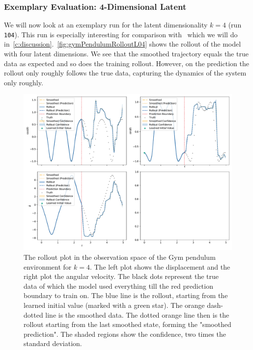 		\subsubsection{Exemplary Evaluation: 4-Dimensional Latent}
			\label{subsubsec:gymPendulumL04}

			We will now look at an exemplary run for the latent dimensionality \( k = 4 \) (run \texttt{104}). This run is especially interesting for comparison with~\cite{mortonDeepVariationalKoopman2019a} which we will do in~\autoref{c:discussion}.~\autoref{fig:gymPendulumRolloutL04} shows the rollout of the model with four latent dimensions. We see that the smoothed trajectory equals the true data as expected and so does the training rollout. However, on the prediction the rollout only roughly follows the true data, capturing the dynamics of the system only roughly.

			\begin{figure}
				\centering
				\includegraphics[width=\linewidth]{figures/results/pendulum-gym/run-latent-dim-04/rollout-observations-N0.pdf}
				\caption[Rollout of the Gym pendulum experiment for 4 latent dimensions]{The rollout plot in the observation space of the Gym pendulum environment for \(k = 4\). The left plot shows the displacement and the right plot the angular velocity. The black dots represent the true data of which the model used everything till the red prediction boundary to train on. The blue line is the rollout, starting from the learned initial value (marked with a green star). The orange dash-dotted line is the smoothed data. The dotted orange line then is the rollout starting from the last smoothed state, forming the "smoothed prediction". The shaded regions show the confidence, \ie two times the standard deviation.}
				\label{fig:gymPendulumRolloutL04}
			\end{figure}

